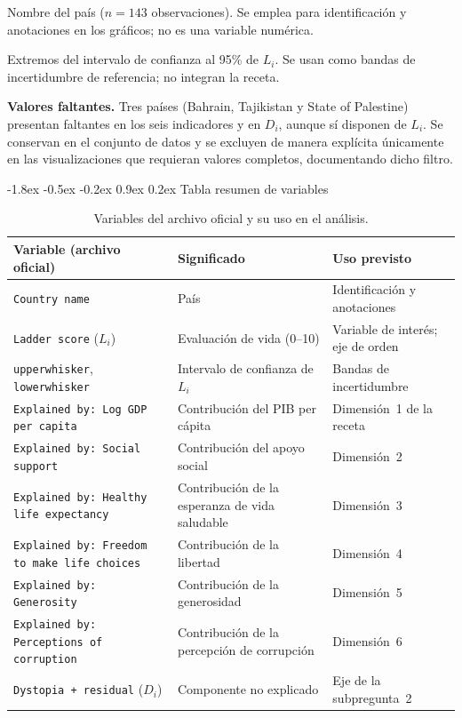 \documentclass[11pt,a4paper]{article}
\makeatletter
\renewcommand\section{\@startsection{section}{1}{\z@}%
  {-1.8ex \@plus -0.5ex \@minus -0.2ex}%
  {0.9ex \@plus0.2ex}%
  {\normalfont\large\bfseries}}
\makeatother
\begin{document}
\begin{description}[style=nextline, leftmargin=2.6em, itemsep=0.35em]
  \item[\texttt{Country name}]
    Nombre del país ($n = 143$ observaciones). Se emplea para identificación y
    anotaciones en los gráficos; no es una variable numérica.
  \item[\texttt{upperwhisker}, \texttt{lowerwhisker}]
    Extremos del intervalo de confianza al 95\% de $L_i$. Se usan como bandas de
    incertidumbre de referencia; no integran la receta.
\end{description}

\textbf{Valores faltantes.} Tres países (Bahrain, Tajikistan y State of Palestine)
presentan faltantes en los seis indicadores y en $D_i$, aunque sí disponen de
$L_i$. Se conservan en el conjunto de datos y se excluyen de manera explícita
únicamente en las visualizaciones que requieran valores completos, documentando
dicho filtro.

\section{Tabla resumen de variables}

\begin{table}[htbp]
\centering
\caption{Variables del archivo oficial y su uso en el análisis.}
\label{tab:variables}
\small
\begin{tabular}{>{\raggedright\arraybackslash}p{4.9cm}
                >{\raggedright\arraybackslash}p{4.7cm}
                >{\raggedright\arraybackslash}p{5.1cm}}
\toprule
\textbf{Variable (archivo oficial)} & \textbf{Significado} & \textbf{Uso previsto} \\
\midrule
\texttt{Country name} & País & Identificación y anotaciones \\
\texttt{Ladder score} ($L_i$) & Evaluación de vida (0--10) & Variable de interés; eje de orden \\
\texttt{upperwhisker}, \texttt{lowerwhisker} & Intervalo de confianza de $L_i$ & Bandas de incertidumbre \\
\texttt{Explained by: Log GDP per capita} & Contribución del PIB per cápita & Dimensión~1 de la receta \\
\texttt{Explained by: Social support} & Contribución del apoyo social & Dimensión~2 \\
\texttt{Explained by: Healthy life expectancy} & Contribución de la esperanza de vida saludable & Dimensión~3 \\
\texttt{Explained by: Freedom to make life choices} & Contribución de la libertad & Dimensión~4 \\
\texttt{Explained by: Generosity} & Contribución de la generosidad & Dimensión~5 \\
\texttt{Explained by: Perceptions of corruption} & Contribución de la percepción de corrupción & Dimensión~6 \\
\texttt{Dystopia + residual} ($D_i$) & Componente no explicado & Eje de la subpregunta~2 \\
\bottomrule
\end{tabular}
\end{table}
\end{document}

